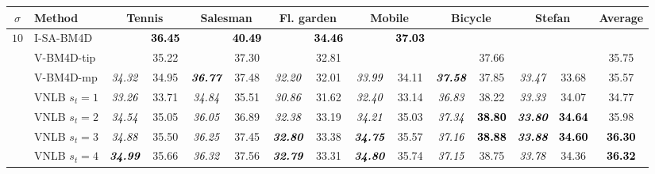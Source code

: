 \documentclass[10pt, a4paper]{article}
\newcommand{\bsic}[1]{\textcolor{black}{\textit{#1}}}
\newcommand{\Bsic}[1]{\textcolor{black}{\textbf{\textit{#1}}}}
\newcommand{\Best}[1]{\textbf{\textcolor{black}{#1}}}
\begin{document}
\begin{landscape}
\begin{table}[htp!]
	\begin{center}
		{\small
		\renewcommand{\tabcolsep}{1.6mm}
		\renewcommand{\arraystretch}{1.3}
		\begin{tabular}{ c | l |c c | c c | c c | c c | c c | c c | c }
			\hline
			\rule{0pt}{6pt}$\sigma$ & Method             & \multicolumn{2}{c}{Tennis}  & \multicolumn{2}{c}{Salesman} &\multicolumn{2}{c}{Fl. garden}& \multicolumn{2}{c}{Mobile}  & \multicolumn{2}{c}{Bicycle}  & \multicolumn{2}{c|}{Stefan} &      Average \\\hline
			\multirow{1}{*}{$10$}
			                      & I-SA-BM4D            & \bsic{     } & \Best{36.45} & \bsic{     } & \Best{40.49}  & \bsic{     } & \Best{34.46}  & \bsic{     } & \Best{37.03} &              &               &              &              &              \\
			                      & V-BM4D-tip           & \bsic{     } &       35.22  & \bsic{     } &       37.30   & \bsic{     } &       32.81   &              &              &              &       37.66   &              &              &       35.75  \\
			                      & V-BM4D-mp            & \bsic{34.32} &       34.95  & \Bsic{36.77} &       37.48   & \bsic{32.20} &       32.01   & \bsic{33.99} &       34.11  & \Bsic{37.58} &       37.85   & \bsic{33.47} &       33.68  &       35.57  \\
			                      & VNLB   $s_t = 1$     & \bsic{33.26} &       33.71  & \bsic{34.84} &       35.51   & \bsic{30.86} &       31.62   & \bsic{32.40} &       33.14  & \bsic{36.83} &       38.22   & \bsic{33.33} &       34.07  &       34.77  \\
			                      & VNLB   $s_t = 2$     & \bsic{34.54} &       35.05  & \bsic{36.05} &       36.89   & \bsic{32.38} &       33.19   & \bsic{34.21} &       35.03  & \bsic{37.34} & \Best{38.80}  & \Bsic{33.80} & \Best{34.64} &       35.98  \\
			                      & VNLB   $s_t = 3$     & \bsic{34.88} &       35.50  & \bsic{36.25} &       37.45   & \Bsic{32.80} &       33.38   & \Bsic{34.75} &       35.57  & \bsic{37.16} & \Best{38.88}  & \Bsic{33.88} & \Best{34.60} & \Best{36.30} \\
			                      & VNLB   $s_t = 4$     & \Bsic{34.99} &       35.66  & \bsic{36.32} &       37.56   & \Bsic{32.79} &       33.31   & \Bsic{34.80} &       35.74  & \bsic{37.15} &      {38.75}  & \bsic{33.78} &       34.36  & \Best{36.32} \\\hline

\end{tabular}}
\end{center}
\end{table}
\end{landscape}
\end{document}
